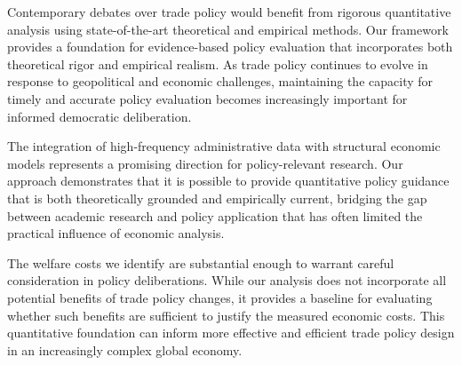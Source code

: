 Contemporary debates over trade policy would benefit from rigorous quantitative analysis using state-of-the-art theoretical and empirical methods. Our framework provides a foundation for evidence-based policy evaluation that incorporates both theoretical rigor and empirical realism. As trade policy continues to evolve in response to geopolitical and economic challenges, maintaining the capacity for timely and accurate policy evaluation becomes increasingly important for informed democratic deliberation.

The integration of high-frequency administrative data with structural economic models represents a promising direction for policy-relevant research. Our approach demonstrates that it is possible to provide quantitative policy guidance that is both theoretically grounded and empirically current, bridging the gap between academic research and policy application that has often limited the practical influence of economic analysis.

The welfare costs we identify are substantial enough to warrant careful consideration in policy deliberations. While our analysis does not incorporate all potential benefits of trade policy changes, it provides a baseline for evaluating whether such benefits are sufficient to justify the measured economic costs. This quantitative foundation can inform more effective and efficient trade policy design in an increasingly complex global economy.
